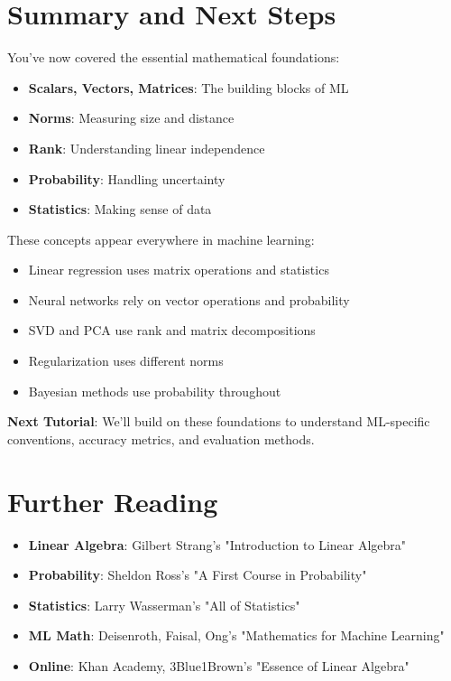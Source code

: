 \documentclass{article}
\begin{document}
\section{Summary and Next Steps}

You've now covered the essential mathematical foundations:
\begin{itemize}
    \item \textbf{Scalars, Vectors, Matrices}: The building blocks of ML
    \item \textbf{Norms}: Measuring size and distance
    \item \textbf{Rank}: Understanding linear independence
    \item \textbf{Probability}: Handling uncertainty
    \item \textbf{Statistics}: Making sense of data
\end{itemize}

These concepts appear everywhere in machine learning:
\begin{itemize}
    \item Linear regression uses matrix operations and statistics
    \item Neural networks rely on vector operations and probability
    \item SVD and PCA use rank and matrix decompositions
    \item Regularization uses different norms
    \item Bayesian methods use probability throughout
\end{itemize}

\textbf{Next Tutorial}: We'll build on these foundations to understand ML-specific conventions, accuracy metrics, and evaluation methods.

\section{Further Reading}

\begin{itemize}
    \item \textbf{Linear Algebra}: Gilbert Strang's "Introduction to Linear Algebra"
    \item \textbf{Probability}: Sheldon Ross's "A First Course in Probability"
    \item \textbf{Statistics}: Larry Wasserman's "All of Statistics"
    \item \textbf{ML Math}: Deisenroth, Faisal, Ong's "Mathematics for Machine Learning"
    \item \textbf{Online}: Khan Academy, 3Blue1Brown's "Essence of Linear Algebra"
\end{itemize}
\end{document}
